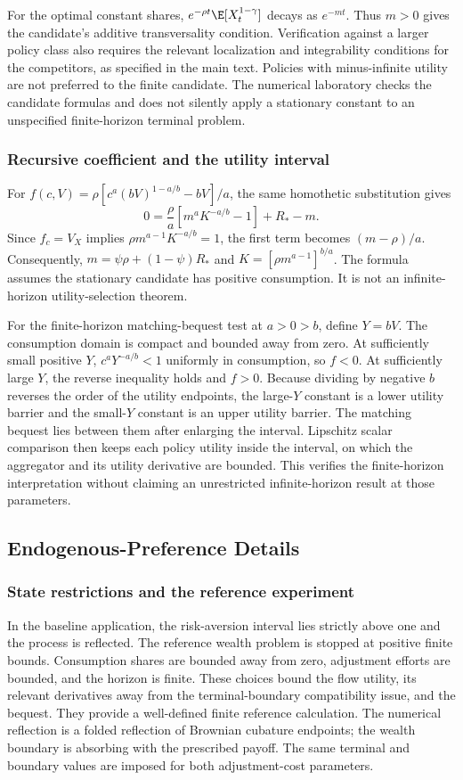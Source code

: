 For the optimal constant shares, $e^{-\rho t}\E[X_t^{1-\gamma}]$ decays as $e^{-m t}$. Thus $m>0$ gives the candidate's additive transversality condition. Verification against a larger policy class also requires the relevant localization and integrability conditions for the competitors, as specified in the main text. Policies with minus-infinite utility are not preferred to the finite candidate. The numerical laboratory checks the candidate formulas and does not silently apply a stationary constant to an unspecified finite-horizon terminal problem.

\subsubsection{Recursive coefficient and the utility interval}
For $f(c,V)=\rho[c^a(bV)^{1-a/b}-bV]/a$, the same homothetic substitution gives
\[
 0=\frac\rho a[m^aK^{-a/b}-1]+R_*-m.
\]
Since $f_c=V_X$ implies $\rho m^{a-1}K^{-a/b}=1$, the first term becomes $(m-\rho)/a$. Consequently, $m=\psi\rho+(1-\psi)R_*$ and $K=[\rho m^{a-1}]^{b/a}$. The formula assumes the stationary candidate has positive consumption. It is not an infinite-horizon utility-selection theorem.

For the finite-horizon matching-bequest test at $a>0>b$, define $Y=bV$. The consumption domain is compact and bounded away from zero. At sufficiently small positive $Y$, $c^aY^{-a/b}<1$ uniformly in consumption, so $f<0$. At sufficiently large $Y$, the reverse inequality holds and $f>0$. Because dividing by negative $b$ reverses the order of the utility endpoints, the large-$Y$ constant is a lower utility barrier and the small-$Y$ constant is an upper utility barrier. The matching bequest lies between them after enlarging the interval. Lipschitz scalar comparison then keeps each policy utility inside the interval, on which the aggregator and its utility derivative are bounded. This verifies the finite-horizon interpretation without claiming an unrestricted infinite-horizon result at those parameters.

\subsection{Endogenous-Preference Details}
\subsubsection{State restrictions and the reference experiment}
In the baseline application, the risk-aversion interval lies strictly above one and the process is reflected. The reference wealth problem is stopped at positive finite bounds. Consumption shares are bounded away from zero, adjustment efforts are bounded, and the horizon is finite. These choices bound the flow utility, its relevant derivatives away from the terminal-boundary compatibility issue, and the bequest. They provide a well-defined finite reference calculation. The numerical reflection is a folded reflection of Brownian cubature endpoints; the wealth boundary is absorbing with the prescribed payoff. The same terminal and boundary values are imposed for both adjustment-cost parameters.

